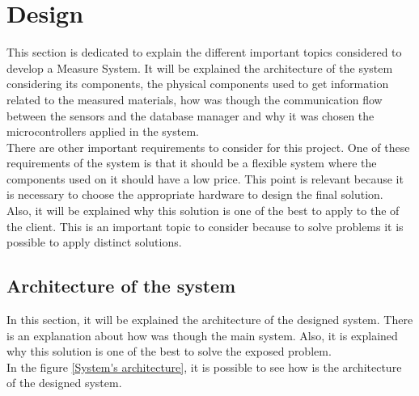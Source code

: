 
\chapter{Design}
\newpage

This section is dedicated to explain the different important topics considered to develop a Measure System. It will be explained the architecture of the system considering its components, the physical components used to get information related to the measured materials, how was though the communication flow between the sensors and the database manager and why it was chosen the microcontrollers applied in the system.\\

There are other important requirements to consider for this project. One of these requirements of the system is that it should be a flexible system where the components used on it should have a low price. This point is relevant because it is necessary to choose the appropriate hardware to design the final solution.\\

Also, it will be explained why this solution is one of the best to apply to the of the client. This is an important topic to consider because to solve problems it is possible to apply distinct solutions.

\section{Architecture of the system}

In this section, it will be explained the architecture of the designed system. There is an explanation about how was though the main system. Also, it is explained why this solution is one of the best to solve the exposed problem.\\

In the figure \ref{System's architecture}, it is possible to see how is the architecture of the designed system.\\

